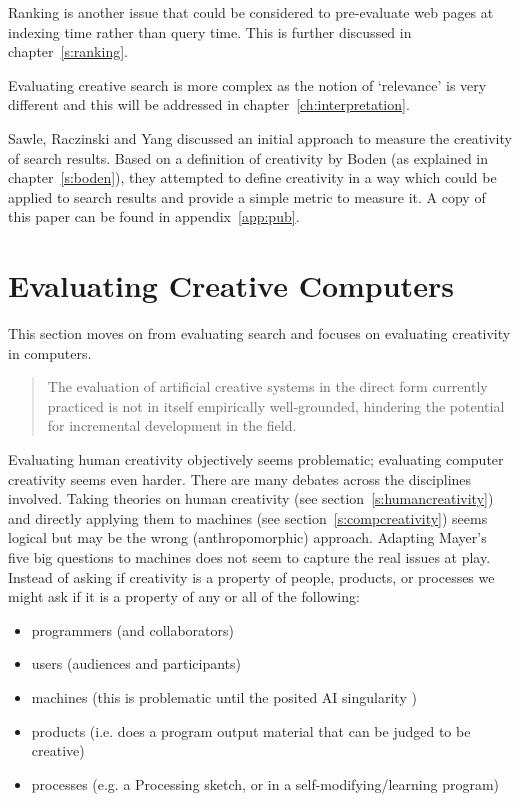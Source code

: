 Ranking is another issue that could be considered to pre-evaluate web pages at indexing time rather than query time. This is further discussed in chapter~\ref{s:ranking}.

\spirals

Evaluating creative search is more complex as the notion of `relevance' is very different and this will be addressed in chapter~\ref{ch:interpretation}. 

Sawle, Raczinski and Yang \autocite*{Sawle2011} discussed an initial approach to measure the creativity of search results. Based on a definition of creativity by Boden (as explained in chapter~\ref{s:boden}), they attempted to define creativity in a way which could be applied to search results and provide a simple metric to measure it. A copy of this paper can be found in appendix~\ref{app:pub}.


\section{Evaluating Creative Computers}
\label{s:creattributes}

This section moves on from evaluating search and focuses on evaluating creativity in computers.

\begin{quotation}
  The evaluation of artificial creative systems in the direct form currently practiced is not in itself empirically well-grounded, hindering the potential for incremental development in the field. 
\end{quotation}

Evaluating human creativity objectively seems problematic; evaluating computer creativity seems even harder. There are many debates across the disciplines involved. Taking theories on human creativity (see section~\ref{s:humancreativity}) and directly applying them to machines (see section~\ref{s:compcreativity}) seems logical but may be the wrong (anthropomorphic) approach. Adapting Mayer's five big questions \autocite*{Mayer1999} to machines does not seem to capture the real issues at play. Instead of asking if creativity is a property of people, products, or processes we might ask if it is a property of any or all of the following:

\begin{itemize}
  \item programmers (and collaborators)
  \item users (audiences and participants)
  \item machines (this is problematic until the posited AI singularity \cite{Schmidhuber2006a})
  \item products (i.e. does a program output material that can be judged to be creative)
  \item processes (e.g. a Processing sketch, or in a self-modifying/learning program)
\end{itemize}

